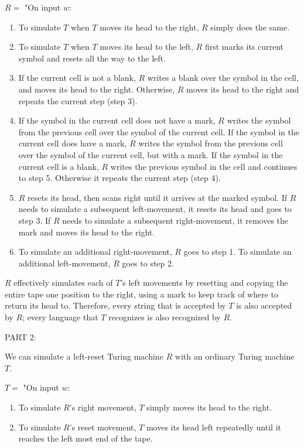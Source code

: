 \documentclass{article}
\begin{document}
  \noindent $R =$ "On input $w$:
  \begin{enumerate} [\indent 1.]
  
  	\item To simulate $T$ when $T$ moves its head to the right, $R$ simply does the same.
  	\item To simulate $T$ when $T$ moves its head to the left, $R$ first marks its current symbol and resets all the way to the left.
  	\item If the current cell is not a blank, $R$ writes a blank over the symbol in the cell, and moves its head to the right. Otherwise, $R$ moves its head to the right and repeats the current step (step 3).
  	\item If the symbol in the current cell does not have a mark, $R$ writes the symbol from the previous cell over the symbol of the current cell. If the symbol in the current cell does have a mark, $R$ writes the symbol from the previous cell over the symbol of the current cell, but with a mark. If the symbol in the current cell is a blank, $R$ writes the previous symbol in the cell and continues to step 5. Otherwise it repeats the current step (step 4).
  	\item $R$ resets its head, then scans right until it arrives at the marked symbol. If $R$ needs to simulate a subsequent left-movement, it resets its head and goes to step 3. If $R$ needs to simulate a subsequent right-movement, it removes the mark and moves its head to the right.
  	\item To simulate an additional right-movement, $R$ goes to step 1. To simulate an additional left-movement, $R$ goes to step 2. \newline
    \end{enumerate}
    
\noindent $R$ effectively simulates each of $T$'s left movements by resetting and copying the entire tape one position to the right, using a mark to keep track of where to return its head to. Therefore, every string that is accepted by $T$ is also accepted by $R$; every language that $T$ recognizes is also recognized by $R$.\newline


\noindent PART 2:

\noindent We can simulate a left-reset Turing machine $R$ with an ordinary Turing machine $T$.\newline
  
  \noindent $T =$ "On input $w$:
  \begin{enumerate} [\indent 1.]
  
  	\item To simulate $R$'s right movement, $T$ simply moves its head to the right.
  	\item To simulate $R$'s reset movement, $T$ moves its head left repeatedly until it reaches the left most end of the tape. 
  	    \end{enumerate}
    
\end{document}
